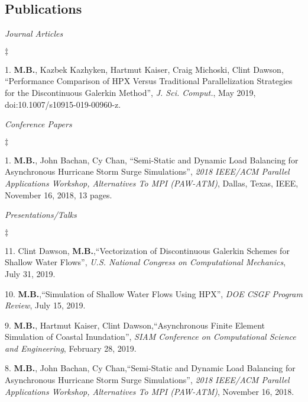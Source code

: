 \documentclass[margin,line]{res}
\newenvironment{list2}{
  \begin{list}{$\ddagger$}{%
      \setlength{\itemsep}{0in}
      \setlength{\parsep}{0in} \setlength{\parskip}{0in}
      \setlength{\topsep}{0in} \setlength{\partopsep}{0in}
      \setlength{\leftmargin}{0.2in}}}{\end{list}}
\newcommand{\article}[5]{%
#1, ``#2'', {\it #3}, #4, #5.%
}
\newcommand{\inproceeding}[7]{%
#1, ``#2'', {\it #3}, #4, #5, #6, #7 pages.%
}
\newcommand{\talk}[4]{%
#1,``#2'', {\it #3}, #4.%
}
\begin{document}
\begin{resume}
\section{\sc Publications}
\textit{Journal Articles}
\vspace{0.05in}
\begin{list2}
\item[1.] \article{{\bf M.B.}, Kazbek Kazhyken, Hartmut Kaiser, Craig Michoski, Clint Dawson}{Performance Comparison of HPX Versus Traditional Parallelization Strategies for the Discontinuous Galerkin Method}{J. Sci. Comput.}{May 2019}{doi:10.1007/s10915-019-00960-z}
\end{list2}
\textit{Conference Papers}
\vspace{0.05in}
\begin{list2}
\item[1.] \inproceeding{{\bf M.B.}, John Bachan, Cy Chan}{Semi-Static and Dynamic Load Balancing for Asynchronous Hurricane Storm Surge Simulations}{2018 IEEE/ACM Parallel Applications Workshop, Alternatives To MPI (PAW-ATM)}{Dallas, Texas}{IEEE}{November 16, 2018}{13}
\end{list2}

\clearpage
\textit{Presentations/Talks}
\vspace{0.05in}
\begin{list2}

\item[11.] \talk{Clint Dawson, {\bf M.B.}}{Vectorization of Discontinuous Galerkin Schemes for Shallow Water Flows}{U.S. National Congress on Computational Mechanics}{July 31, 2019}

\item[10.] \talk{{\bf M.B.}}{Simulation of Shallow Water Flows Using HPX}{DOE CSGF Program Review}{July 15, 2019}

\item[9.] \talk{{\bf M.B.}, Hartmut Kaiser, Clint Dawson}{Asynchronous Finite Element Simulation of Coastal Inundation}{SIAM Conference on 
Computational Science and Engineering}{February 28, 2019}

\item[8.] \talk{{\bf M.B.}, John Bachan, Cy Chan}{Semi-Static and Dynamic Load Balancing for Asynchronous Hurricane Storm Surge Simulations}{2018 IEEE/ACM Parallel Applications Workshop, Alternatives To MPI (PAW-ATM)}{November 16, 2018}


\end{list2}
\end{resume}
\end{document}
